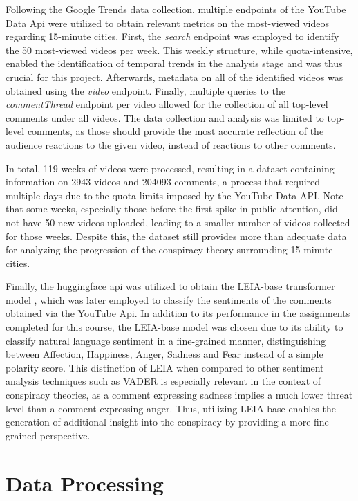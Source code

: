 \documentclass[fontsize=11pt, parskip=half]{scrartcl}
\begin{document}
    Following the Google Trends data collection, multiple endpoints of the YouTube Data Api were utilized to obtain relevant metrics on the most-viewed videos regarding 15-minute cities. First, the \textit{search} endpoint was employed to identify the 50 most-viewed videos per week. This weekly structure, while quota-intensive, enabled the identification of temporal trends in the analysis stage and was thus crucial for this project. Afterwards, metadata on all of the identified videos was obtained using the \textit{video} endpoint. Finally, multiple queries to the \textit{commentThread} endpoint per video allowed for the collection of all top-level comments under all videos. The data collection and analysis was limited to top-level comments, as those should provide the most accurate reflection of the audience reactions to the given video, instead of reactions to other comments.
    
    In total, 119 weeks of videos were processed, resulting in a dataset containing information on 2943 videos and 204093 comments, a process that required multiple days due to the quota limits imposed by the YouTube Data API. Note that some weeks, especially those before the first spike in public attention, did not have 50 new videos uploaded, leading to a smaller number of videos collected for those weeks. Despite this, the dataset still provides more than adequate data for analyzing the progression of the conspiracy theory surrounding 15-minute cities. 

    Finally, the huggingface api was utilized to obtain the LEIA-base transformer model \parencite{aroyehunLEIALinguisticEmbeddings2023}, which was later employed to classify the sentiments of the comments obtained via the YouTube Api. In addition to its performance in the assignments completed for this course, the LEIA-base model was chosen due to its ability to classify natural language sentiment in a fine-grained manner, distinguishing between Affection, Happiness, Anger, Sadness and Fear instead of a simple polarity score. This distinction of LEIA when compared to other sentiment analysis techniques such as VADER \parencite{cjhuttoVaderSentiment2020} is especially relevant in the context of conspiracy theories, as a comment expressing sadness implies a much lower threat level than a comment expressing anger. Thus, utilizing LEIA-base enables the generation of additional insight into the conspiracy by providing a more fine-grained perspective.

\section{Data Processing}
\label{section:processing}
\end{document}
